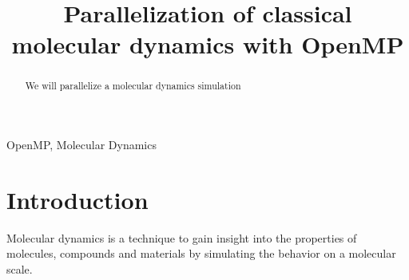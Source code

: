 \documentclass[conference]{IEEEtran}
\begin{document}
\title{Parallelization of classical molecular dynamics with OpenMP
\\
}
\author{
\and
{}
\and
{}
\and
{}
}

\maketitle
\thispagestyle{plain}


\begin{abstract}
We will parallelize a molecular dynamics simulation
\end{abstract}

\begin{IEEEkeywords}
OpenMP, Molecular Dynamics
\end{IEEEkeywords}

\section{Introduction}
Molecular dynamics is a technique to gain insight into the properties of molecules, compounds and materials by
simulating the behavior on a molecular scale. 
\end{document}
